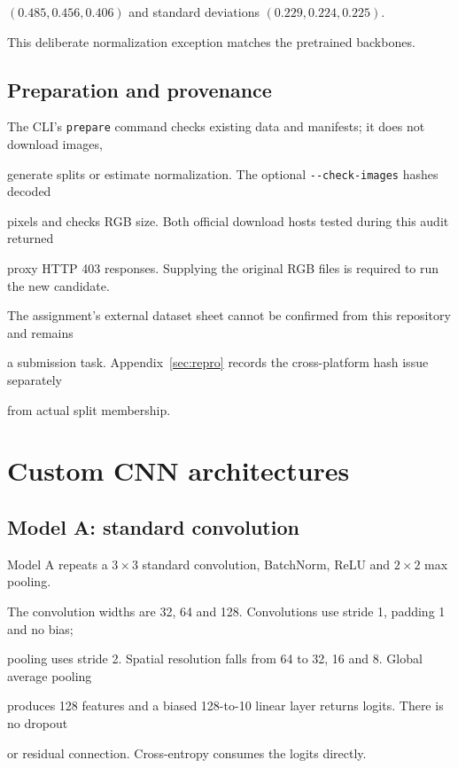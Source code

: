 \documentclass[11pt,a4paper]{article}
\DeclareRobustCommand{\code}[1]{\nolinkurl{#1}}
\begin{document}
$(0.485,0.456,0.406)$ and standard deviations $(0.229,0.224,0.225)$.

This deliberate normalization exception matches the pretrained backbones.



\subsection{Preparation and provenance}

The CLI's \code{prepare} command checks existing data and manifests; it does not download images,

generate splits or estimate normalization. The optional \code{--check-images} hashes decoded

pixels and checks RGB size. Both official download hosts tested during this audit returned

proxy HTTP 403 responses. Supplying the original RGB files is required to run the new candidate.

The assignment's external dataset sheet cannot be confirmed from this repository and remains

a submission task. Appendix~\ref{sec:repro} records the cross-platform hash issue separately

from actual split membership.



\section{Custom CNN architectures}

\subsection{Model A: standard convolution}

Model A repeats a $3\times3$ standard convolution, BatchNorm, ReLU and $2\times2$ max pooling.

The convolution widths are 32, 64 and 128. Convolutions use stride 1, padding 1 and no bias;

pooling uses stride 2. Spatial resolution falls from 64 to 32, 16 and 8. Global average pooling

produces 128 features and a biased 128-to-10 linear layer returns logits. There is no dropout

or residual connection. Cross-entropy consumes the logits directly.
\end{document}
